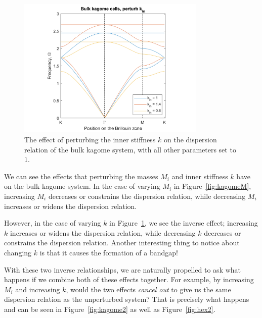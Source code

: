 \begin{figure}[!h]
\centering
\includegraphics[width=0.8\textwidth]{imgs/kagomeperturbk.png}
\caption{\label{fig:kagomek} The effect of perturbing the inner stiffness $k$
  on the dispersion relation of the bulk kagome system, with all other
  parameters set to $1$.}
\end{figure}

We can see the effects that perturbing the masses $M_i$ and inner stiffness $k$
have on the bulk kagome system. In the case of varying $M_i$ in
Figure~\ref{fig:kagomeM}, increasing $M_i$ decreases or constrains the
dispersion relation, while decreasing $M_i$ increases or widens the dispersion
relation. 

However, in the case of varying $k$ in Figure~\ref{fig:kagomek}, we see the inverse
effect; increasing $k$ increases or widens the dispersion relation, while
decreasing $k$ decreases or constrains the dispersion relation. Another
interesting thing to notice about changing $k$ is that it causes the formation
of a bandgap!

With these two inverse relationships, we are naturally propelled to ask what
happens if we combine both of these effects together. For example, by
increasing $M_i$ and increasing $k$, would the two effects \textit{cancel out}
to give us the same dispersion relation as the unperturbed system? That is
precisely what happens and can be seen in Figure~\ref{fig:kagome2} as well as
Figure~\ref{fig:hex2}.

